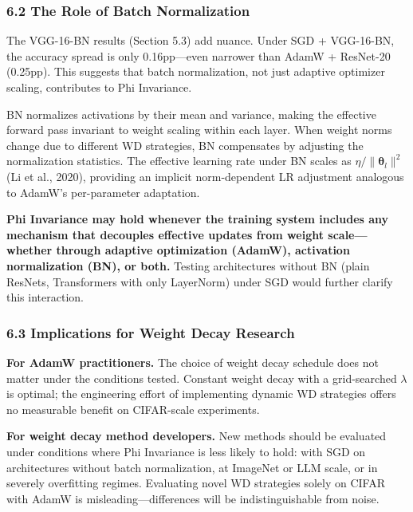 \documentclass[
]{article}
\begin{document}
\hypertarget{the-role-of-batch-normalization}{%
\subsubsection{6.2 The Role of Batch
Normalization}\label{the-role-of-batch-normalization}}

The VGG-16-BN results (Section 5.3) add nuance. Under SGD + VGG-16-BN,
the accuracy spread is only 0.16pp---even narrower than AdamW +
ResNet-20 (0.25pp). This suggests that batch normalization, not just
adaptive optimizer scaling, contributes to Phi Invariance.

BN normalizes activations by their mean and variance, making the
effective forward pass invariant to weight scaling within each layer.
When weight norms change due to different WD strategies, BN compensates
by adjusting the normalization statistics. The effective learning rate
under BN scales as \(\eta / \|\boldsymbol{\theta}_l\|^2\) (Li et al.,
2020), providing an implicit norm-dependent LR adjustment analogous to
AdamW's per-parameter adaptation.

\textbf{Phi Invariance may hold whenever the training system includes
any mechanism that decouples effective updates from weight
scale---whether through adaptive optimization (AdamW), activation
normalization (BN), or both.} Testing architectures without BN (plain
ResNets, Transformers with only LayerNorm) under SGD would further
clarify this interaction.

\hypertarget{implications-for-weight-decay-research}{%
\subsubsection{6.3 Implications for Weight Decay
Research}\label{implications-for-weight-decay-research}}

\textbf{For AdamW practitioners.} The choice of weight decay schedule
does not matter under the conditions tested. Constant weight decay with
a grid-searched \(\lambda\) is optimal; the engineering effort of
implementing dynamic WD strategies offers no measurable benefit on
CIFAR-scale experiments.

\textbf{For weight decay method developers.} New methods should be
evaluated under conditions where Phi Invariance is less likely to hold:
with SGD on architectures without batch normalization, at ImageNet or
LLM scale, or in severely overfitting regimes. Evaluating novel WD
strategies solely on CIFAR with AdamW is misleading---differences will
be indistinguishable from noise.
\end{document}
